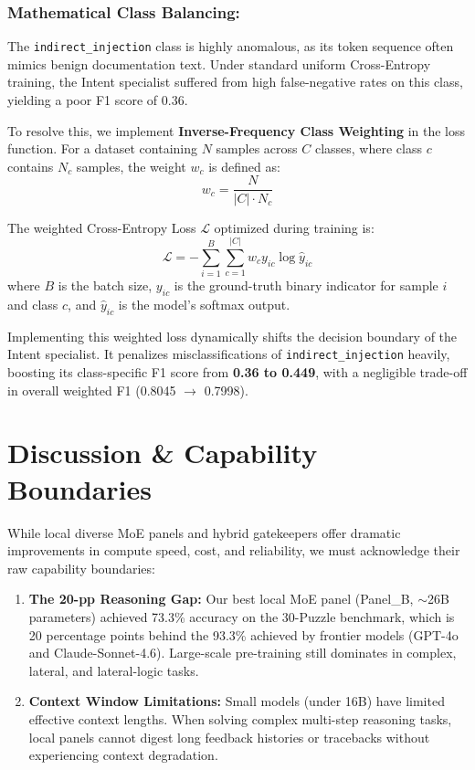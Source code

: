 \documentclass[11pt,a4paper]{article}
\begin{document}
\subsubsection{Mathematical Class Balancing:}
The \texttt{indirect\_injection} class is highly anomalous, as its token sequence often mimics benign documentation text. Under standard uniform Cross-Entropy training, the Intent specialist suffered from high false-negative rates on this class, yielding a poor F1 score of 0.36.

To resolve this, we implement \textbf{Inverse-Frequency Class Weighting} in the loss function. For a dataset containing $N$ samples across $C$ classes, where class $c$ contains $N_c$ samples, the weight $w_c$ is defined as:
\begin{equation}
    w_c = \frac{N}{|C| \cdot N_c}
\end{equation}

The weighted Cross-Entropy Loss $\mathcal{L}$ optimized during training is:
\begin{equation}
    \mathcal{L} = -\sum_{i=1}^{B} \sum_{c=1}^{|C|} w_c y_{ic} \log \hat{y}_{ic}
\end{equation}
where $B$ is the batch size, $y_{ic}$ is the ground-truth binary indicator for sample $i$ and class $c$, and $\hat{y}_{ic}$ is the model's softmax output.

Implementing this weighted loss dynamically shifts the decision boundary of the Intent specialist. It penalizes misclassifications of \texttt{indirect\_injection} heavily, boosting its class-specific F1 score from \textbf{0.36 to 0.449}, with a negligible trade-off in overall weighted F1 (0.8045 $\rightarrow$ 0.7998).

\section{Discussion \& Capability Boundaries}

While local diverse MoE panels and hybrid gatekeepers offer dramatic improvements in compute speed, cost, and reliability, we must acknowledge their raw capability boundaries:
\begin{enumerate}
    \item \textbf{The 20-pp Reasoning Gap:} Our best local MoE panel (Panel\_B, $\sim$26B parameters) achieved 73.3\% accuracy on the 30-Puzzle benchmark, which is 20 percentage points behind the 93.3\% achieved by frontier models (GPT-4o and Claude-Sonnet-4.6). Large-scale pre-training still dominates in complex, lateral, and lateral-logic tasks.
    \item \textbf{Context Window Limitations:} Small models (under 16B) have limited effective context lengths. When solving complex multi-step reasoning tasks, local panels cannot digest long feedback histories or tracebacks without experiencing context degradation.
\end{enumerate}
\end{document}
